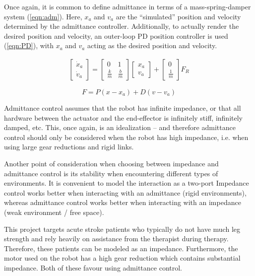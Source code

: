 \documentclass[12pt]{report}
\begin{document}
	Once again, it is common to define admittance in terms of a mass-spring-damper system (\ref{eqn:adm}). Here, $x_a$ and $v_a$ are the ``simulated'' position and velocity determined by the admittance controller. Additionally, to actually render the desired position and velocity, an outer-loop PD position controller is used (\ref{eqn:PD}), with $x_a$ and $v_a$ acting as the desired position and velocity. 
	
	\begin{gather} \label{eqn:adm}
	\begin{bmatrix}
    	\dot{x}_a \\
    	\dot{v}_a 
    \end{bmatrix} 
    =
    \begin{bmatrix}
    	0 & 1 \\
    	\frac{k}{m} & \frac{b}{m}
    \end{bmatrix} 
    \begin{bmatrix}
    	x_a \\
    	v_a
    \end{bmatrix}  
    +
    \begin{bmatrix}
    	0 \\
    	\frac{1}{m}
    \end{bmatrix}
    F_R   	
	\end{gather}
	
	\begin{equation} \label{eqn:PD}
	F = P(x - x_a) + D(v - v_a)
	\end{equation}

	Admittance control assumes that the robot has infinite impedance, or that all hardware between the actuator and the end-effector is infinitely stiff, infinitely damped, etc. This, once again, is an idealization -- and therefore admittance control should only be considered when the robot has high impedance, i.e. when using large gear reductions and rigid links. 
	
	Another point of consideration when choosing between impedance and admittance control is its stability when encountering different types of environments. It is convenient to model the interaction as a two-port
	Impedance control works better when interacting with an admittance (rigid environments), whereas admittance control works better when interacting with an impedance (weak environment / free space). 
	
	This project targets acute stroke patients who typically do not have much leg strength and rely heavily on assistance from the therapist during therapy. Therefore, these patients can be modeled as an impedance. Furthermore, the motor used on the robot has a high gear reduction which contains substantial impedance. Both of these favour using admittance control. 
	
\end{document}
